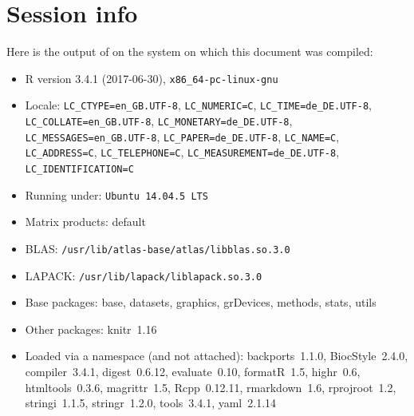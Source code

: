 \documentclass{article}\usepackage[]{graphicx}\usepackage[usenames,dvipsnames]{color}
\begin{document}
\section{Session info}

Here is the output of  on the system on which
this document was compiled:
\begin{itemize}\raggedright
  \item R version 3.4.1 (2017-06-30), \verb|x86_64-pc-linux-gnu|
  \item Locale: \verb|LC_CTYPE=en_GB.UTF-8|, \verb|LC_NUMERIC=C|, \verb|LC_TIME=de_DE.UTF-8|, \verb|LC_COLLATE=en_GB.UTF-8|, \verb|LC_MONETARY=de_DE.UTF-8|, \verb|LC_MESSAGES=en_GB.UTF-8|, \verb|LC_PAPER=de_DE.UTF-8|, \verb|LC_NAME=C|, \verb|LC_ADDRESS=C|, \verb|LC_TELEPHONE=C|, \verb|LC_MEASUREMENT=de_DE.UTF-8|, \verb|LC_IDENTIFICATION=C|
  \item Running under: \verb|Ubuntu 14.04.5 LTS|
  \item Matrix products: default
  \item BLAS: \verb|/usr/lib/atlas-base/atlas/libblas.so.3.0|
  \item LAPACK: \verb|/usr/lib/lapack/liblapack.so.3.0|
  \item Base packages: base, datasets, graphics,
    grDevices, methods, stats, utils
  \item Other packages: knitr~1.16
  \item Loaded via a namespace (and not attached):
    backports~1.1.0, BiocStyle~2.4.0, compiler~3.4.1,
    digest~0.6.12, evaluate~0.10, formatR~1.5,
    highr~0.6, htmltools~0.3.6, magrittr~1.5,
    Rcpp~0.12.11, rmarkdown~1.6, rprojroot~1.2,
    stringi~1.1.5, stringr~1.2.0, tools~3.4.1,
    yaml~2.1.14
\end{itemize}



\end{document}

